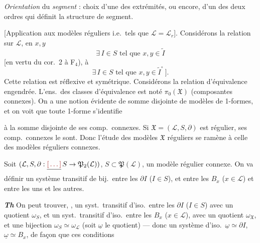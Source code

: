 \documentclass[11pt,a4paper]{article}
\begin{document}
\emph{Orientation} du \emph{segment} : choix d'une des extrémités, ou encore, d'un des deux ordres qui définit la structure de segment.


[Application aux modèles réguliers i.e.\ tels que $\mathcal{L} = \mathcal{L}_r$]. Considérons la relation sur $\mathcal{L}$, en $x, y$
\[
  \exists\, I \in S \text{ tel que } x, y \in \widetilde{I}
\]
[en vertu du cor.~2 à F$_4$),  à
\[
  \exists\, I \in S \text{ tel que } x, y \in \widetilde{I}^{\circ}\ ].
\]
Cette relation est réflexive et symétrique. Considérons la relation d'équivalence engendrée. L'ens.\ des classes d'équivalence est noté $\pi_0(\mathfrak{X})$ (composantes connexes). On a une notion évidente de somme disjointe de modèles de 1-formes, et on voit que toute 1-forme s'identifie

à la somme disjointe de ses comp.\ connexes. \struck{\ill{}} Si $\mathfrak{X} = (\mathcal{L}, S, \partial)$ est régulier,  ses comp.\ connexes le sont. Donc l'étude des modèles $\mathfrak{X}$ réguliers  se ramène à celle des modèles réguliers connexes.

Soit $(\mathcal{L}, S, \partial : \struck{\ill{}}\, S \to \mathfrak{P}_2(\mathcal{L}))$, $S \subset \mathfrak{P}(\mathcal{L})$, un modèle régulier connexe. On va définir un système transitif de bij.\ entre les $\partial I$ ($I \in S$), et entre les $B_x$ ($x \in \mathcal{L}$) et entre les uns et les autres.   

\textbf{\emph{Th}} On peut trouver, , un syst.\ transitif d'iso.\ entre les $\partial I$ ($I \in S$) avec un quotient $\omega_S$, et un syst.\ transitif d'iso.\ entre les $B_x$ ($x \in \mathcal{L}$), avec un quotient $\omega_{\mathfrak{X}}$, et une bijection $\omega_S \simeq \omega_{\mathcal{L}}$ (soit $\underline{\omega}$ le quotient) --- donc un système d'iso.\ $\underline{\omega} \simeq \partial I$, $\underline{\omega} \simeq B_x$, de façon que ces conditions
\end{document}
